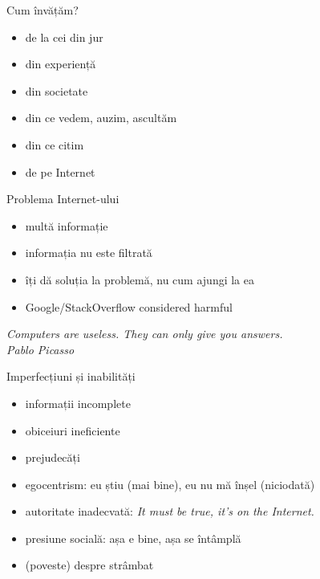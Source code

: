\documentclass{beamer}
\begin{document}
\begin{frame}{Cum învățăm?}
  \begin{itemize}
    \pause \item de la cei din jur
    \pause \item din experiență
    \pause \item din societate
    \pause \item din ce vedem, auzim, ascultăm
    \pause \item din ce citim
    \pause \item de pe Internet
  \end{itemize}
\end{frame}

\begin{frame}{Problema Internet-ului}
  \begin{itemize}
    \pause \item multă informație
    \item informația nu este filtrată
    \pause \item îți dă soluția la problemă, nu cum ajungi la ea
    \pause \item Google/StackOverflow considered harmful
  \end{itemize}
  \pause
  \vspace{1cm}
  \centering
  \textit{Computers are useless. They can only give you answers.}\\
  \vspace{3mm}
  \hfill \textit{Pablo Picasso}
\end{frame}

\begin{frame}{Imperfecțiuni și inabilități}
  \begin{itemize}
    \pause \item informații incomplete
    \pause \item obiceiuri ineficiente
    \pause \item prejudecăți
    \pause \item egocentrism: eu știu (mai bine), eu nu mă înșel (niciodată)
    \pause \item autoritate inadecvată: \textit{It must be true, it's on the Internet.}
    \pause \item presiune socială: așa e bine, așa se întâmplă
    \pause \item (poveste) despre strâmbat
  \end{itemize}
\end{frame}
\end{document}
